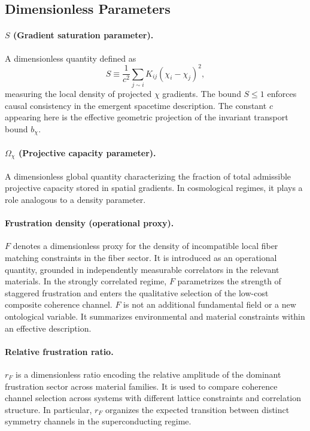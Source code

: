 \subsection{Dimensionless Parameters}
  \label{subsec:dimensionless-parameters}

  \paragraph{\texorpdfstring{$S$}{S} (Gradient saturation parameter).}
    A dimensionless quantity defined as
    \begin{equation}
      S \equiv \frac{1}{c^2}\sum_{j\sim i} K_{ij}(\chi_i-\chi_j)^2 ,
      \label{eq:gradient-saturation-parameter}
    \end{equation}
    measuring the local density of projected $\chi$ gradients.
    The bound $S \leq 1$ enforces causal consistency in the emergent
    spacetime description.
    The constant $c$ appearing here is the effective geometric projection
    of the invariant transport bound $b_{\chi}$.

  \paragraph{\texorpdfstring{$\Omega_\chi$}{Ωχ} (Projective capacity parameter).}
    A dimensionless global quantity characterizing the fraction of total admissible
    projective capacity stored in spatial gradients.
    In cosmological regimes, it plays a role analogous to a density parameter.

  \paragraph[$F$]{Frustration density (operational proxy).}
    $F$ denotes a dimensionless proxy for the density of incompatible local fiber matching constraints in the fiber
    sector.
    It is introduced as an operational quantity, grounded in independently measurable correlators in the relevant
    materials.
    In the strongly correlated regime, $F$ parametrizes the strength of staggered frustration and enters the qualitative
    selection of the low-cost composite coherence channel.
    $F$ is not an additional fundamental field or a new ontological variable.
    It summarizes environmental and material constraints within an effective description.

  \paragraph[$r_F$]{Relative frustration ratio.}
    $r_F$ is a dimensionless ratio encoding the relative amplitude of the dominant frustration sector across material
    families.
    It is used to compare coherence channel selection across systems with different lattice constraints and correlation
    structure.
    In particular, $r_F$ organizes the expected transition between distinct symmetry channels in the superconducting
    regime.
